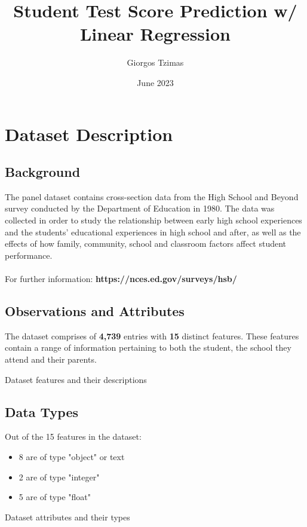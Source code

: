 \documentclass[12pt]{article}
\title{Student Test Score Prediction w/ Linear Regression}
\author{Giorgos Tzimas }
\date{June 2023}
\begin{document}
\maketitle


\section{Dataset Description}
\subsection{Background}
The panel dataset contains cross-section data from the High School and Beyond survey conducted by the Department of Education in 1980. The data was collected in order to study the relationship between early high school experiences and the students' educational experiences in high school and after, as well as the effects of how family, community, school and classroom factors affect student performance.\\ \\
For further information: \textbf{https://nces.ed.gov/surveys/hsb/}

\subsection{Observations and Attributes}
The dataset comprises of \textbf{4,739} entries with \textbf{15} distinct features. These features contain a range of information pertaining to both the student, the school they attend and their parents.

\begin{table}[h]
    \centering
    
    \caption{Dataset features and their descriptions}
    \label{tab:var_descriptions}
\end{table}

\vfill
\subsection{Data Types}
Out of the 15 features in the dataset:
\begin{itemize}
  \item 8 are of type "object" or text
  \item 2 are of type "integer"
  \item 5 are of type "float"
\end{itemize}

\begin{table}[h!]
    \centering
    
    
    \caption{Dataset attributes and their types}
    \label{tab:dtypes}
\end{table}
\end{document}
